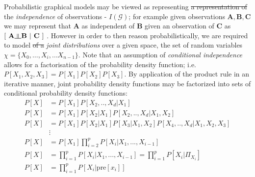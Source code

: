 \documentclass[7pt]{article}
\newcommand{\inperp}{\rotatebox[origin=c]{90}{$\models$}}
\begin{document}
Probabilistic graphical models may be viewed as representing \st{a representation of} the \emph{independence} of observations - $I(\mathcal{G})$; for example given observations $\mathbf{A,B,C}$ we may represent that $\mathbf{A}$ as independent of $\mathbf{B}$ given an observation of $\mathbf{C}$ as $[\hspace{0.05in} \mathbf{A \inperp B \hspace{0.05in} \vert \hspace{0.05in} C \hspace{0.05in}}]$ \cite{pearl1988probabilistic}. However in order to then reason probabilistically, we are required to model \st{of a} \emph{joint distributions} over a given space, the set of random variables $\chi = \{X_0,…,X_i, … X_{n-1}\}$. Note that an assumption of \emph{conditional independence} allows for a factorisation of the probability density function; i.e. $P[X_1,X_2,X_3] = P[X_1] P[X_2] P[X_3]$. By application of the product rule in an iterative manner, joint probability density functions may be factorized into sets of conditional probability density functions:
 \begin{equation}
 \begin{split}
 P[X] & = P[X_1] P[X_2,..,X_d|X_1] \\
 P[X] & = P[X_1] P[X_2|X_1]  P[X_2,..,X_d|X_1,X_2] \\
 P[X] & = P[X_1] P[X_2|X_1]  P[X_3|X_1,X_2]   P[X_4,..,X_d|X_1,X_2,X_3] \\
 & \vdots \\
 P[X] & = P[X_1] \prod_{i=2}^p P[X_i|X_1,...,X_{i-1}] \\
 P[X] & = \prod_{i=1}^p P[X_i|X_1,...,X_{i-1}] = \prod_{i=1}^p P[X_i|\Pi_{X_i}] \\
 P[X] & = \prod_{i=1}^p P[X_i|\text{pre}[x_i]] \\
 \end{split}
 \end{equation}
\end{document}
